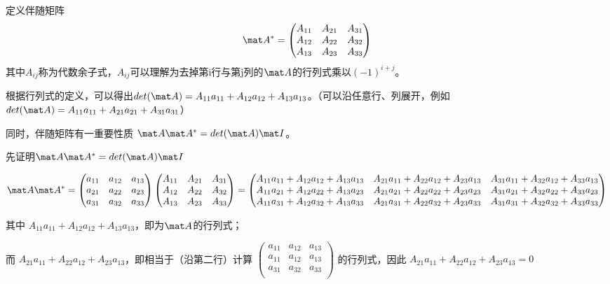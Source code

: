 定义伴随矩阵
\begin{equation}
\mat A^*=
\begin{pmatrix}
A_{11}&A_{21}&A_{31}\\
A_{12}&A_{22}&A_{32}\\
A_{13}&A_{23}&A_{33}\\
\end{pmatrix}
\end{equation}
其中$A_{ij}$称为代数余子式，$A_{ij}$可以理解为去掉第i行与第j列的$\mat A$的行列式乘以$(-1)^{i+j}$。

根据行列式的定义，可以得出$det(\mat A) = A_{11}a_{11}+A_{12}a_{12}+A_{13}a_{13}$。（可以沿任意行、列展开，例如$det(\mat A) = A_{11}a_{11}+A_{21}a_{21}+A_{31}a_{31}$）

同时，伴随矩阵有一重要性质 $\mat A \mat A^* = det(\mat A)\mat I$。

先证明$\mat A \mat A^* = det(\mat A)\mat I$

\begin{equation}
\mat A \mat A^* =
\begin{pmatrix}
a_{11}&a_{12}&a_{13}\\
a_{21}&a_{22}&a_{23}\\
a_{31}&a_{32}&a_{33}\\
\end{pmatrix}
\begin{pmatrix}
A_{11}&A_{21}&A_{31}\\
A_{12}&A_{22}&A_{32}\\
A_{13}&A_{23}&A_{33}\\
\end{pmatrix}
=
\begin{pmatrix}
A_{11}a_{11}+A_{12}a_{12}+A_{13}a_{13}&A_{21}a_{11}+A_{22}a_{12}+A_{23}a_{13}&A_{31}a_{11}+A_{32}a_{12}+A_{33}a_{13}\\
A_{11}a_{21}+A_{12}a_{22}+A_{13}a_{23}&A_{21}a_{21}+A_{22}a_{22}+A_{23}a_{23}&A_{31}a_{21}+A_{32}a_{22}+A_{33}a_{23}\\
A_{11}a_{31}+A_{12}a_{32}+A_{13}a_{33}&A_{21}a_{31}+A_{22}a_{32}+A_{23}a_{33}&A_{31}a_{31}+A_{32}a_{32}+A_{33}a_{33}\\
\end{pmatrix}
\end{equation}

其中
$
A_{11}a_{11}+A_{12}a_{12}+A_{13}a_{13}
$，即为$\mat A$的行列式；

而
$
A_{21}a_{11}+A_{22}a_{12}+A_{23}a_{13}
$，即相当于（沿第二行）计算
$
\begin{pmatrix}
a_{11}&a_{12}&a_{13}\\
a_{11}&a_{12}&a_{13}\\
a_{31}&a_{32}&a_{33}\\
\end{pmatrix}
$
的行列式，因此
$
A_{21}a_{11}+A_{22}a_{12}+A_{23}a_{13}=0
$

